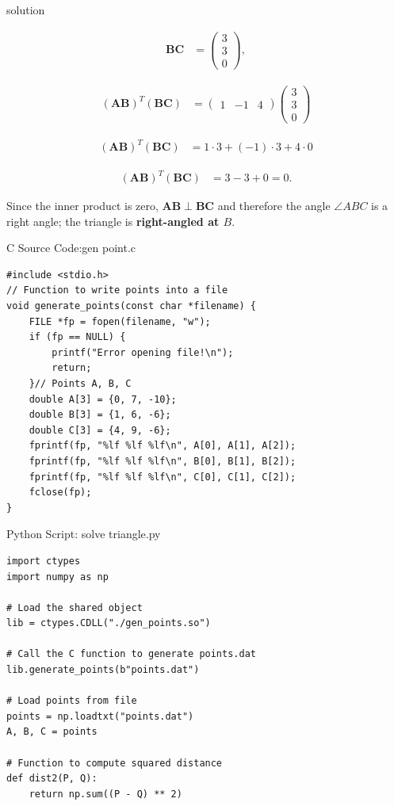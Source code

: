 \documentclass{beamer}
\numberwithin{equation}{section}
\theoremstyle{remark}
\newcommand{\myvec}[1]{\ensuremath{\begin{pmatrix}#1\end{pmatrix}}}
\let\vec\mathbf
\begin{document}
\begin{frame}{solution}

\begin{align}
\vec{BC} &= \myvec{3\\3\\0},
\end{align}


\begin{align}
(\vec{AB})^T(\vec{BC}) &= \myvec{1&-1&4}\myvec{3\\3\\0}
\end{align}

\begin{align}
(\vec{AB})^T(\vec{BC}) &= 1\cdot 3 + (-1)\cdot 3 + 4\cdot 0
\end{align}

\begin{align}
(\vec{AB})^T(\vec{BC}) &= 3 - 3 + 0 = 0.
\end{align}

Since the inner product is zero, $\vec{AB}\perp\vec{BC}$ and therefore the angle $\angle ABC$ is a right angle; the triangle is \textbf{right-angled at $B$}.




\end{frame}
\begin{frame}[fragile]{C Source Code:gen point.c}
\begin{verbatim}
#include <stdio.h>
// Function to write points into a file
void generate_points(const char *filename) {
    FILE *fp = fopen(filename, "w");
    if (fp == NULL) {
        printf("Error opening file!\n");
        return;
    }// Points A, B, C
    double A[3] = {0, 7, -10};
    double B[3] = {1, 6, -6};
    double C[3] = {4, 9, -6};
    fprintf(fp, "%lf %lf %lf\n", A[0], A[1], A[2]);
    fprintf(fp, "%lf %lf %lf\n", B[0], B[1], B[2]);
    fprintf(fp, "%lf %lf %lf\n", C[0], C[1], C[2]);
    fclose(fp);
}
\end{verbatim}
\end{frame}

\begin{frame}[fragile]{Python Script: solve triangle.py}
\begin{verbatim}
import ctypes
import numpy as np

# Load the shared object
lib = ctypes.CDLL("./gen_points.so")

# Call the C function to generate points.dat
lib.generate_points(b"points.dat")

# Load points from file
points = np.loadtxt("points.dat")
A, B, C = points

# Function to compute squared distance
def dist2(P, Q):
    return np.sum((P - Q) ** 2)
    \end{verbatim}
\end{frame}
\end{document}
